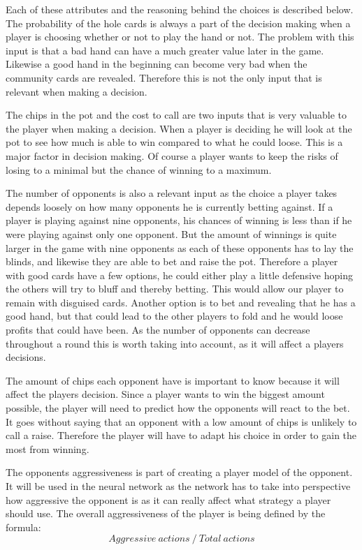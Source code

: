 Each of these attributes and the reasoning behind the choices is described below.\\

The probability of the hole cards is always a part of the decision making when a player is choosing whether or not to play the hand or not. The problem with this input is that a bad hand can have a much greater value later in the game. Likewise a good hand in the beginning can become very bad when the community cards are revealed. Therefore this is not the only input that is relevant when making a decision.


The chips in the pot and the cost to call are two inputs that is very valuable to the player when making a decision. When a player is deciding he will look at the pot to see how much is able to win compared to what he could loose. This is a major factor in decision making. Of course a player wants to keep the risks of losing to a minimal but the chance of winning to a maximum.

The number of opponents is also a relevant input as the choice a player takes depends loosely on how many opponents he is currently betting against. If a player is playing against nine opponents, his chances of winning is less than if he were playing against only one opponent. But the amount of winnings is quite larger in the game with nine opponents as each of these opponents has to lay the blinds, and likewise they are able to bet and raise the pot.
Therefore a player with good cards have a few options, he could either play a little defensive hoping the others will try to bluff and thereby betting. This would allow our player to remain with disguised cards. Another option is to bet and revealing that he has a good hand, but that could lead to the other players to fold and he would loose profits that could have been. As the number of opponents can decrease throughout a round this is worth taking into account, as it will affect a players decisions.

The amount of chips each opponent have is important to know because it will affect the players decision. Since a player wants to win the biggest amount possible, the player will need to predict how the opponents will react to the bet. It goes without saying that an opponent with a low amount of chips is unlikely to call a raise. Therefore the player will have to adapt his choice in order to gain the most from winning.

The opponents aggressiveness is part of creating a player model of the opponent. It will be used in the neural network as the network has to take into perspective how aggressive the opponent is as it can really affect what strategy a player should use.
The overall aggressiveness of the player is being defined by the formula:
\[ Aggressive ~ actions ~ / ~ Total ~ actions \]


